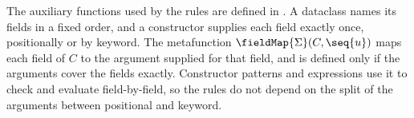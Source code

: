 The auxiliary functions used by the rules are defined in .
A dataclass names its fields in a fixed order, and a constructor supplies each field exactly once,
positionally or by keyword. The metafunction $\fieldMap{\Sigma}(C, \seq{u})$ maps each field of $C$ to the argument supplied for that field,
and is defined only if the arguments cover the fields exactly. Constructor patterns and expressions
use it to check and evaluate field-by-field, so the rules do not depend on the split of the arguments between positional and
keyword.

